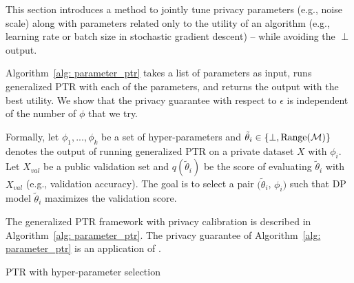 This section introduces a method to jointly tune privacy parameters (e.g., noise scale) along with parameters related only to the utility of an algorithm (e.g., learning rate or batch size in stochastic gradient descent) -- while avoiding the $\perp$ output.

Algorithm~\ref{alg: parameter_ptr} takes a list of parameters as input, runs generalized PTR with each of the parameters, and returns the output with the best utility. We show that the privacy guarantee with respect to $\epsilon$ is independent of the number of $\phi$ that we try.  

Formally, let $\phi_1, ..., \phi_k$ be a set of hyper-parameters and $\tilde{\theta}_i \in\{\perp, \text{Range}(\mathcal{M})\}$ denotes the output of running generalized PTR on a private dataset $X$ with $\phi_i$. 
Let $X_{val}$ be a public validation set and $q(\tilde{\theta}_i)$ be the score of evaluating $\tilde{\theta}_i$ with $X_{val}$ (e.g., validation accuracy). The goal is to select a pair $(\tilde{\theta}_i$, $\phi_i)$ such that DP model $\tilde{\theta}_i$ maximizes the validation score.

The generalized PTR framework with privacy calibration is described in Algorithm~\ref{alg: parameter_ptr}. The privacy guarantee of Algorithm~\ref{alg: parameter_ptr} is an application of \citet{liu2019private}.


\begin{algorithm}[H]
	\caption{PTR with hyper-parameter selection}
	\label{alg: parameter_ptr}
	\begin{algorithmic}[1]
		\ENDFOR %
	\end{algorithmic}
\end{algorithm}

